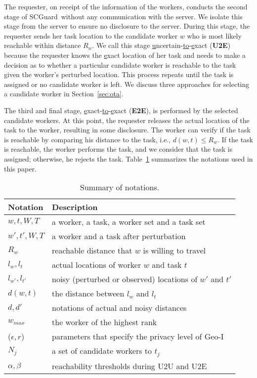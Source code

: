 \documentclass{USC-Thesis}
\newcommand{\tn}{\tabularnewline}
\newcommand{\SCG}{{SCGuard}}
\numberwithin{equation}{chapter}
\begin{document}
The requester, on receipt of the information of the workers, conducts the second stage of \SCG\ without any communication with the server. We isolate this stage from the server to ensure no disclosure to the server. During this stage, the requester sends her task location to the candidate worker $w$ who is most likely reachable within distance $R_w$. We call this stage \underline{u}ncertain-\underline{to}-\underline{e}xact (\textbf{U2E}) because the requester knows the \underline{e}xact location of her task and needs to make a decision as to whether a particular candidate worker is reachable to the task given the worker's perturbed location. This process repeats until the task is assigned or no candidate worker is left.
We discuss three approaches for selecting a candidate worker in Section~\ref{sec:ota}.

The third and final stage, \underline{e}xact-\underline{to}-\underline{e}xact (\textbf{E2E}), is performed by the selected candidate workers. At this point, the requester releases the actual location of the task to the worker, resulting in some disclosure. The worker can verify if the task is reachable by comparing his distance to the task, i.e., $\mathit{d(w,t)\le R_w}$. If the task is reachable, the worker performs the task, and we consider that the task is assigned; otherwise, he rejects the task. Table~\ref{tab:notation2} summarizes the notations used in this paper.

\begin{table}
\begin{center}
\footnotesize
\scriptsize{
\begin{tabular}{ l | l}
\hline
\textbf{Notation} & \textbf{Description} \tn
\hline
$w, t, W, T$ &  a worker, a task, a worker set and a task set \tn
\hline
$w', t', W, T$ &  a worker and a task after perturbation \tn
\hline
$R_w$ & reachable distance that $w$ is willing to travel \tn
\hline
$l_w, l_t$ & actual locations of worker $w$ and task $t$ \tn
\hline
$l_{w'}, l_{t'}$ & noisy (perturbed or observed) locations of $w'$ and $t'$ \tn
\hline
$d(w,t)$ & the distance between $l_w$ and $l_t$ \tn
\hline
$d, d'$ & notations of actual and noisy distances \tn
\hline
$w_{max}$ & the worker of the highest rank \tn
\hline
($\epsilon, r$) & parameters that specify the privacy level of Geo-I \tn
\hline
$N_j$ & a set of candidate workers to $t_j$ \tn
\hline
$\alpha, \beta$ & reachability thresholds during U2U and U2E\tn
\hline
\end{tabular}}
\caption{Summary of notations.}\label{tab:notation2}
\end{center}
\end{table}
\end{document}
